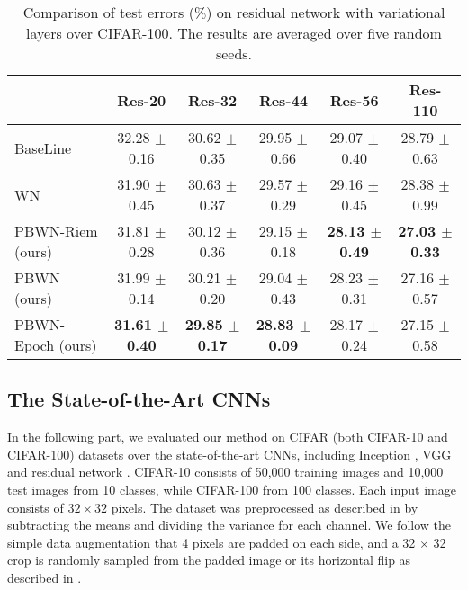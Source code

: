 \documentclass[twocolumn]{article}
\begin{document}
\begin{table*}[t]
\caption{Comparison of test errors ($\%$) on residual network with variational layers over CIFAR-100. The results are averaged over five random seeds.}%
\label{table:resnet2}
\vskip 0.0in
\begin{center}
\begin{small}
\begin{tabular}{l|ccccc}
\toprule
     & Res-20 & Res-32 & Res-44 & Res-56 & Res-110 \\
\hline
BaseLine  &  32.28 $\pm$ 0.16 &30.62  $\pm$ 0.35  &29.95 $\pm$ 0.66 & 29.07 $\pm$ 0.40  & 28.79 $\pm$ 0.63\\
WN  &  31.90 $\pm$ 0.45 &30.63  $\pm$ 0.37  &29.57 $\pm$ 0.29 & 29.16 $\pm$ 0.45  & 28.38 $\pm$ 0.99\\
PBWN-Riem (ours) &  31.81 $\pm$ 0.28 &30.12  $\pm$ 0.36  &29.15 $\pm$ 0.18 & \textbf{28.13 $\pm$ 0.49}  & \textbf{27.03 $\pm$ 0.33}\\
PBWN (ours) &  31.99 $\pm$ 0.14 &30.21  $\pm$ 0.20  &29.04 $\pm$ 0.43 & 28.23 $\pm$ 0.31  & 27.16 $\pm$ 0.57\\
PBWN-Epoch (ours)  &  \textbf{31.61 $\pm$ 0.40}  &\textbf{29.85 $\pm$ 0.17 } &\textbf{28.83 $\pm$ 0.09 }  & 28.17 $\pm$ 0.24    &   27.15 $\pm$ 0.58\\
\bottomrule
\end{tabular}
\end{small}
\end{center}
\end{table*}
\subsection{The State-of-the-Art CNNs}
In the following part, we evaluated our method on CIFAR (both CIFAR-10 and CIFAR-100) datasets over the state-of-the-art CNNs, including Inception \cite{2014_CoRR_Szegedy}, VGG \cite{2014_CoRR_Simonyan} and residual network \cite{2015_CVPR_He,2016_CoRR_Zagoruyko}. CIFAR-10 consists of 50,000 training images and 10,000 test images from 10 classes, while CIFAR-100 from 100 classes. Each input image consists of $32\times 32$ pixels. The dataset was preprocessed as described in \cite{2015_CVPR_He} by subtracting the means and dividing the variance for each channel. We follow the simple data augmentation that 4 pixels are padded on each side, and a 32 $\times$ 32 crop is randomly sampled from the padded image or its horizontal flip as described in \cite{2015_CVPR_He}.
\end{document}

